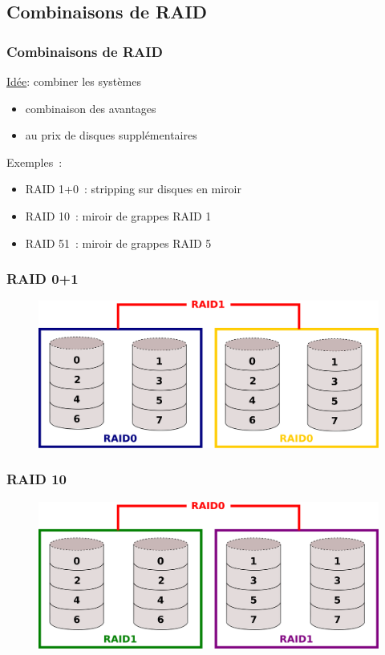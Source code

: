 \subsection{Combinaisons de RAID}
\begin{frame}
  \frametitle{Combinaisons de RAID}
  \underline{Idée}: combiner les systèmes
  \begin{itemize}
  \item combinaison des avantages
  \item au prix de disques supplémentaires
  \end{itemize}
  \vspace{0.5cm}

  Exemples~: 
  \begin{itemize}
  \item \alert{RAID 1+0}~: stripping sur disques en miroir
  \item \alert{RAID 10}~: miroir de grappes RAID 1
  \item \alert{RAID 51}~: miroir de grappes RAID 5
  \end{itemize}
\end{frame}


\begin{frame}
\frametitle{RAID 0+1}
\begin{figure}
  \includegraphics[width=\linewidth]{fig3/RAID0+1}
\end{figure}
\end{frame}

\begin{frame}
\frametitle{RAID 10}
\begin{figure}
  \includegraphics[width=\linewidth]{fig3/RAID10}
\end{figure}
\end{frame}

